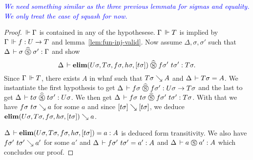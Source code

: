 \documentclass[a4paper,english]{lipics-utf8x}
\newcommand\meta[1]{\noindent\textcolor{blue}{\emph{#1}}}
\begin{document}
  \meta{We need something similar as the three previous lemmata for sigmas and
  equality. We only treat the case of squash for now.}

  \begin{lemma}
    \leavevmode
    \begin{mathc}
    \end{mathc}
  \end{lemma}

  \begin{proof}
    $\,\Vdash \Gamma$ is contained in any of the hypothesese.
    $\Gamma \,\Vdash T$ is implied by $\Gamma \,\Vdash f : U \to T$ and
    lemma~\ref{lem:fun-inj-valid}.
    Now assume $\Delta, \sigma, \sigma'$ such that
    $\Delta \,\vdash \sigma \mathrel{\widehat{\mathrel{\circledS}}} \sigma' : \Gamma$ and
    show
    \[\Delta \,\vdash \operatorname{\mathbf{elim}}(U \sigma,T \sigma,f \sigma,h \sigma,[t \sigma]) \mathrel{\widehat{\mathrel{\circledS}}}
    f \sigma'\ t \sigma' : T \sigma.\]
    Since $\Gamma \,\Vdash T$, there exists $A$ in whnf such that $T \sigma \searrow A$
    and $\Delta \,\vdash T \sigma = A$.
    We instantiate the first hypothesis to get
    $\Delta \,\vdash f \sigma \mathrel{\widehat{\mathrel{\circledS}}} f \sigma' : U \sigma \to T \sigma$
    and the last to get
    $\Delta \,\vdash t \sigma \mathrel{\widehat{\mathrel{\circledS}}} t \sigma' : U \sigma$.
    We then get
    $\Delta \,\vdash f \sigma\ t \sigma \mathrel{\widehat{\mathrel{\circledS}}} f \sigma'\ t \sigma' : T \sigma$.
    With that we have $f \sigma\ t \sigma \searrow a$ for some $a$ and since
    $[t \sigma] \searrow [t \sigma]$, we deduce
    $\operatorname{\mathbf{elim}}(U \sigma,T \sigma,f \sigma,h \sigma,[t \sigma]) \searrow a$.

    \noindent %
    $\Delta \,\vdash \operatorname{\mathbf{elim}}(U \sigma,T \sigma,f \sigma,h \sigma,[t \sigma]) = a : A$
    is deduced form transitivity.
    We also have $f \sigma'\ t \sigma' \searrow a'$ for some $a'$ and
    $\Delta \,\vdash f \sigma'\ t \sigma' = a' : A$
    and $\Delta \,\vdash a \mathrel{\circledS} a' : A$ which concludes our proof.
  \end{proof}

  \begin{lemma}
    \leavevmode
    \begin{mathc}
    \end{mathc}
  \end{lemma}
\end{document}
